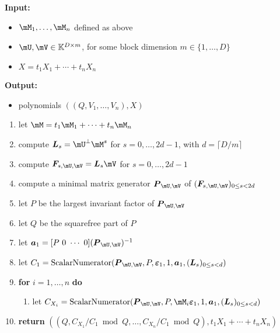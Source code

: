 \documentclass[12pt]{article}
\newcommand{\mat}[1]{\bm{\MakeUppercase{#1}}} %
\newcommand{\row}[1]{\bm{\MakeLowercase{#1}}} %
\newcommand{\col}[1]{\bm{\MakeLowercase{#1}}} %
\newcommand{\seqelt}[1]{\bm{F}_{#1}} %
\newcommand{\minpoly}{P}
\newcommand{\mainalgoname}{\mathsf{ BlockParametrization}}
\newcommand{\lf}{X}
\newcommand{\sqfree}{Q}
\begin{document}
\begin{algorithm}[H]
	\caption{$\mainalgoname(\mM_1,\dots,\mM_n,\mU,\mV,\lf)$}
	{\bf Input:} \vspace{-0.5em}
	\begin{itemize}
		\item $\mM_1,\dots,\mM_n$ defined as above
		\item  $\mU,\mV \in \mathbb{K}^{D \times m}$, for some block dimension  $m \in \{1,\dots,D\}$
                \item $\lf =t_1 X_1 + \cdots + t_n X_n$
	\end{itemize}
	{\bf Output:}  \vspace{-0.5em}
        \begin{itemize}
        \item         polynomials $((\sqfree,V_1,\dots,V_n),\lf)$
        \end{itemize}
  \begin{enumerate}
  \item\label{mainstep1}   let $\mM = t_1 \mM_1 + \cdots + t_n \mM_n$
  \item\label{mainstep3} { compute $\mat{L}_s = \mU^{\perp}\mM^s$ for $s=0,\dots,2d-1$, with $d = \lceil D/m \rceil$}
  \item\label{mainstep4} { compute $\seqelt{s,\mU,\mV}= \mat{L}_s\mV$ for $s=0,\dots, 2d-1$}
  \item\label{mainstep5} { compute a minimal matrix generator $\mat{P}_{\mU,\mV}$ of $(\seqelt{s,\mU,\mV})_{0 \le s < 2d}$}
  \item\label{mainstep6} { let $\minpoly$ be the largest invariant factor of $\mat{P}_{\mU,\mV}$}
  \item\label{mainstep7} { let $\sqfree$ be  the squarefree part  of $\minpoly$}
  \item\label{mainstep8} { let $\row{a}_1 = [P~0 ~\cdots~ 0] (\mat{P}_{\mU,\mV})^{-1}$}
  \item\label{mainstep9}  let $C_1 = \mathrm{ScalarNumerator}(\mat{P}_{\mU,\mV}, \minpoly, \col{\varepsilon}_1, 1, \row{a}_1, 
    (\mat{L}_s)_{0 \le s < d})$
  \item\label{mainstep10} \textbf{for} $i=1,\dots,n$ \textbf{do}
    \begin{enumerate}
     \item let $C_{X_i} = \mathrm{ScalarNumerator}(\mat{P}_{\mU,\mV}, \minpoly, \mM_i\col{\varepsilon}_1, 1, \row{a}_1, (\mat{L}_s)_{0 \le s < d})$
    \end{enumerate}
\item\label{mainstep11}     \textbf{return} $((\sqfree, C_{X_1}/ C_1 \bmod \sqfree, \dots, C_{X_n}/ C_{1} \bmod \sqfree),t_1 X_1 + \cdots + t_n X_n)$
  \end{enumerate}  \label{algo:block-sparse-fglm}
\end{algorithm}
\end{document}
